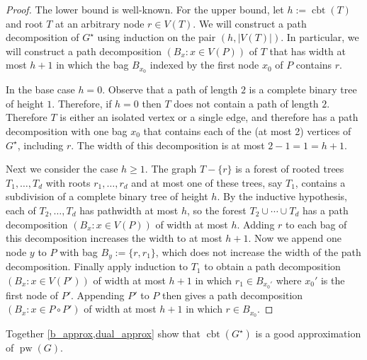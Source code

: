 \documentclass[kpfonts]{patmorin}
\DeclareMathOperator{\pw}{pw}
\DeclareMathOperator{\sh}{cbt}
\begin{document}
\begin{proof}
    The lower bound is well-known.  For the upper bound, let $h:=\sh(T)$ and root $T$ at an arbitrary node $r\in V(T)$.  We will construct a path decomposition of $G^\star$ using induction on the pair $(h, |V(T)|)$.  In particular, we will construct a path decomposition $(B_x:x\in V(P))$ of $T$ that has width at most $h+1$ in which the bag $B_{x_0}$ indexed by the first node $x_0$ of $P$ contains $r$.

    In the base case $h=0$.  Observe that a path of length $2$ is a complete binary tree of height $1$. Therefore, if $h=0$ then $T$ does not contain a path of length $2$.  Therefore $T$ is either an isolated vertex or a single edge, and therefore has a path decomposition with one bag $x_0$ that contains each of the (at most 2) vertices of $G^\star$, including $r$.  The width of this decomposition is at most $2-1=1=h+1$.

    Next we consider the case $h\ge 1$. The graph $T-\{r\}$ is a forest of rooted trees $T_1,\ldots,T_d$ with roots $r_1,\ldots,r_d$ and at most one of these trees, say $T_1$, contains a subdivision of a complete binary tree of height $h$.  By the inductive hypothesis, each of $T_2,\ldots, T_d$ has pathwidth at most $h$, so the forest $T_2\cup\cdots\cup T_d$ has a path decomposition $(B_x:x\in V(P))$ of width at most $h$. Adding $r$ to each bag of this decomposition increases the width to at most $h+1$.  Now we append one node $y$ to $P$ with bag $B_y:=\{r,r_1\}$, which does not increase the width of the path decomposition.  Finally apply induction to $T_1$ to obtain a path decomposition $(B_x:x\in V(P'))$ of width at most $h+1$ in which $r_1\in B_{x_0'}$ where $x_0'$ is the first node of $P'$.  Appending $P'$ to $P$ then gives a path decomposition $(B_x:x\in P\mathbin{\circ}P')$ of width at most $h+1$ in which $r\in B_{x_0}$.
\end{proof}

Together \cref{b_approx,dual_approx} show that $\sh(G^\star)$ is a good approximation of $\pw(G)$.
\end{document}
